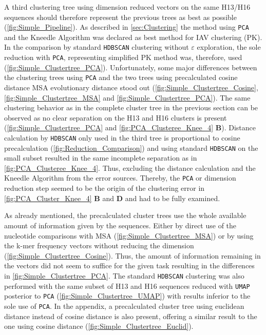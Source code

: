 A third clustering tree using dimension reduced vectors on the same H13/H16 sequences should therefore represent the previous trees as best as possible (\autoref{fig:Simple_Pipeline}). As described in \autoref{sec:Clustering} the method using \texttt{PCA} and the Kneedle Algorithm was declared as best method for \gls{IAV} clustering (PK). In the comparison by standard \texttt{HDBSCAN} clustering without $\varepsilon$ exploration, the sole reduction with \texttt{PCA}, representing simplified PK method was, therefore, used (\autoref{fig:Simple_Clustertree_PCA}). Unfortunately, some major differences between the clustering trees using \texttt{PCA} and the two trees using precalculated cosine distance \gls{MSA} evolutionary distance stood out (\autoref{fig:Simple_Clustertree_Cosine}, \autoref{fig:Simple_Clustertree_MSA} and \autoref{fig:Simple_Clustertree_PCA}). The same clustering behavior as in the complete cluster tree in the previous section can be observed as no clear separation on the H13 and H16 clusters is present (\autoref{fig:Simple_Clustertree_PCA} and \autoref{fig:PCA_Clusteree_Knee_4} \textbf{\textsf{B}}). Distance calculation by \texttt{HDBSCAN} only used in the third tree is proportional to cosine precalculation (\autoref{fig:Reduction_Comparison}) and using standard \texttt{HDBSCAN} on the small subset resulted in the same incomplete separation as in \autoref{fig:PCA_Clusteree_Knee_4}. Thus, excluding the distance calculation and the Kneedle Algorithm from the error sources. Thereby, the \texttt{PCA} or dimension reduction step seemed to be the origin of the clustering error in \autoref{fig:PCA_Cluster_Knee_4} \textbf{\textsf{B}} and \textbf{\textsf{D}} and had to be fully examined.

\vspace{1em}

As already mentioned, the precalculated cluster trees use the whole available amount of information given by the sequences. Either by direct use of the nucleotide comparisons with \gls{MSA} (\autoref{fig:Simple_Clustertree_MSA}) or by using the k-mer frequency vectors without reducing the dimension (\autoref{fig:Simple_Clustertree_Cosine}). Thus, the amount of information remaining in the vectors did not seem to suffice for the given task resulting in the differences in \autoref{fig:Simple_Clustertree_PCA}. The standard \texttt{HDBSCAN} clustering was also performed with the same subset of H13 and H16 sequences reduced with \texttt{UMAP} posterior to \texttt{PCA} (\autoref{fig:Simple_Clustertree_UMAP}) with results inferior to the sole use of \texttt{PCA}. In the appendix, a precalculated cluster tree using euclidean distance instead of cosine distance is also present, offering a similar result to the one using cosine distance (\autoref{fig:Simple_Clustertree_Euclid}).